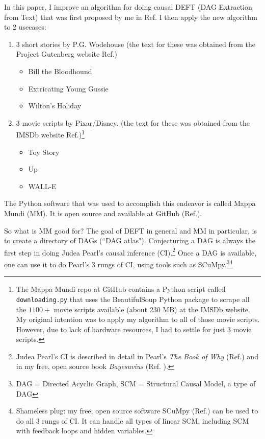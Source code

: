 \documentclass[12pt]{article}
\begin{document}
In this paper, I improve an algorithm
for doing causal DEFT (DAG Extraction from Text)
that was
first proposed by me in Ref.\cite{deft1}
I then apply the new algorithm to 2 usecases:
\begin{enumerate}

\item 3 short stories by P.G. Wodehouse
(the text for these was obtained from the
Project Gutenberg website Ref.\cite{project-gutenberg}) 

\begin{itemize}
\item  Bill the Bloodhound
\item  Extricating Young Gussie
\item Wilton's Holiday
\end{itemize}

\item 3 movie scripts by Pixar/Disney.
(the text for these was obtained from the IMSDb website Ref.\cite{imsdb})\footnote{The Mappa Mundi repo at GitHub
contains a Python script called {\tt downloading.py}
that uses the BeautifulSoup Python
package to scrape all the $1100+$ movie
scripts available (about 230 MB) at the IMSDb website.
My original intention
was to apply my algorithm to 
all of those movie scripts.
However, due to lack of
hardware resources, I had to 
settle for just 3 movie scripts.}

\begin{itemize}
\item Toy Story 
\item Up
\item WALL-E
\end{itemize}
\end{enumerate}

The Python 
software that was used to 
accomplish this endeavor is 
called Mappa Mundi (MM). It is open source and available
at GitHub (Ref.\cite{github-mappa-mundi}).



So what is MM good for? The goal of DEFT in general and MM in particular, is to create a directory 
of DAGs (``DAG atlas").
Conjecturing
a DAG is always the first step
in doing Judea Pearl's causal inference (CI).\footnote{Judea Pearl's CI is described
in detail in Pearl's {\it The Book of Why}
(Ref.\cite{book-of-why})
and in my free, open source book {\it Bayesuvius} (Ref. \cite{bayesuvius}).}
Once a DAG is available,
one can use it to 
do Pearl's 3 rungs of CI,
using tools such as SCuMpy.\footnote{DAG = Directed Acyclic Graph, SCM = Structural Causal Model, a type of DAG}\footnote{Shameless plug: my free, open source software
SCuMpy (Ref.\cite{scumpy})
can be used to do all 3 rungs
of CI. 
It can handle all types of linear SCM, including
SCM with feedback loops and hidden variables.} 
\end{document}
